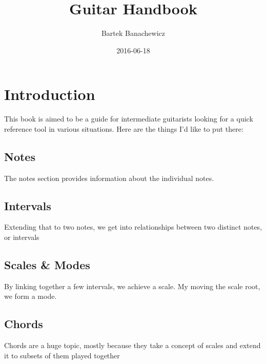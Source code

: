\documentclass{article}
\title{Guitar Handbook}
\date{2016-06-18}
\author{Bartek Banachewicz}
\begin{document}
\maketitle
\newpage

\section{Introduction}
\noindent
This book is aimed to be a guide for intermediate guitarists looking for a quick reference tool in various situations.
Here are the things I'd like to put there:
\subsection{Notes}
The notes section provides information about the individual notes.
\subsection{Intervals}
Extending that to two notes, we get into relationships between two distinct notes, or intervals
\subsection{Scales \& Modes}
By linking together a few intervals, we achieve a scale. My moving the scale root, we form a mode.
\subsection{Chords}
Chords are a huge topic, mostly because they take a concept of scales and extend it to subsets of them played together
\end{document}
